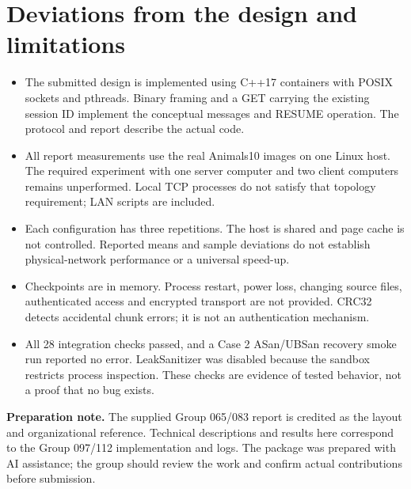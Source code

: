 \documentclass[11pt,a4paper]{article}
\begin{document}
\section{Deviations from the design and limitations}
\begin{itemize}
\item The submitted design is implemented using C++17 containers with POSIX sockets and pthreads. Binary framing and a GET carrying the existing session ID implement the conceptual messages and RESUME operation. The protocol and report describe the actual code.
\item All report measurements use the real Animals10 images on one Linux host. The required experiment with one server computer and two client computers remains unperformed. Local TCP processes do not satisfy that topology requirement; LAN scripts are included.
\item Each configuration has three repetitions. The host is shared and page cache is not controlled. Reported means and sample deviations do not establish physical-network performance or a universal speed-up.
\item Checkpoints are in memory. Process restart, power loss, changing source files, authenticated access and encrypted transport are not provided. CRC32 detects accidental chunk errors; it is not an authentication mechanism.
\item All 28 integration checks passed, and a Case 2 ASan/UBSan recovery smoke run reported no error. LeakSanitizer was disabled because the sandbox restricts process inspection. These checks are evidence of tested behavior, not a proof that no bug exists.
\end{itemize}
{\footnotesize\color{muted}\textbf{Preparation note.} The supplied Group 065/083 report is credited as the layout and organizational reference. Technical descriptions and results here correspond to the Group 097/112 implementation and logs. The package was prepared with AI assistance; the group should review the work and confirm actual contributions before submission.}
\end{document}
